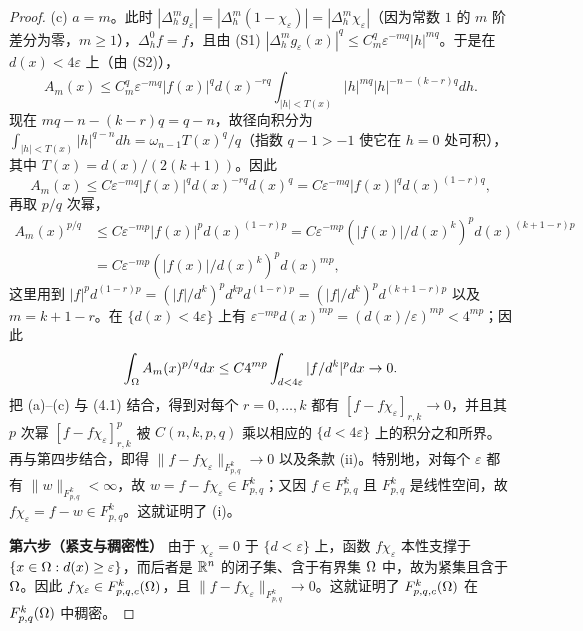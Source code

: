 \begin{proof}
(c) $a = m$。此时 $|\Delta_h^m g_\varepsilon| = |\Delta_h^m(1 - \chi_\varepsilon)| = |\Delta_h^m \chi_\varepsilon|$（因为常数 $1$ 的 $m$ 阶差分为零，$m \ge 1$），$\Delta_h^0 f = f$，且由 (S1) $|\Delta_h^m g_\varepsilon(x)|^q \le C_m^q \varepsilon^{-mq} |h|^{mq}$。于是在 $d(x) < 4 \varepsilon$ 上（由 (S2)），
\[
A_m(x) \le C_m^q \varepsilon^{-mq} |f(x)|^q d(x)^{-rq} \int_{|h|<T(x)} |h|^{mq} |h|^{-n-(k-r)q} dh.
\]
现在 $mq - n - (k-r)q = q - n$，故径向积分为 $\int_{|h|<T(x)} |h|^{q-n} dh = \omega_{n-1} T(x)^q / q$（指数 $q-1 > -1$ 使它在 $h = 0$ 处可积），其中 $T(x) = d(x)/(2(k+1))$。因此
\[
A_m(x) \le C \varepsilon^{-mq} |f(x)|^q d(x)^{-rq} d(x)^q = C \varepsilon^{-mq} |f(x)|^q d(x)^{(1-r)q},
\]
再取 $p/q$ 次幂，
\[
\begin{aligned}
A_m(x)^{p/q} &\le C \varepsilon^{-mp} |f(x)|^p d(x)^{(1-r)p} = C \varepsilon^{-mp} (|f(x)|/d(x)^k)^p d(x)^{(k+1-r)p} \\
&= C \varepsilon^{-mp} (|f(x)|/d(x)^k)^p d(x)^{mp},
\end{aligned}
\]
这里用到 $|f|^p d^{(1-r)p} = (|f|/d^k)^p d^{kp} d^{(1-r)p} = (|f|/d^k)^p d^{(k+1-r)p}$ 以及 $m = k+1-r$。在 $\{d(x) < 4 \varepsilon\}$ 上有 $\varepsilon^{-mp} d(x)^{mp} = (d(x)/\varepsilon)^{mp} < 4^{mp}$；因此
\[
\int_\Omega A_m(x)^{p/q} dx \le C 4^{mp} \int_{d<4\varepsilon} |f/d^k|^p dx \to 0.
\]
把 (a)--(c) 与 (4.1) 结合，得到对每个 $r = 0,\dots,k$ 都有 $[f - f \chi_\varepsilon]_{r,k} \to 0$，并且其 $p$ 次幂 $[f-f \chi_\varepsilon]_{r,k}^p$ 被 $C(n,k,p,q)$ 乘以相应的 $\{d<4\varepsilon\}$ 上的积分之和所界。再与第四步结合，即得 $\|f - f \chi_\varepsilon\|_{F^k_{p,q}} \to 0$ 以及条款 (ii)。特别地，对每个 $\varepsilon$ 都有 $\|w\|_{F^k_{p,q}} < \infty$，故 $w = f - f \chi_\varepsilon \in F^k_{p,q}$；又因 $f \in F^k_{p,q}$ 且 $F^k_{p,q}$ 是线性空间，故 $f \chi_\varepsilon = f - w \in F^k_{p,q}$。这就证明了 (i)。

\textbf{第六步（紧支与稠密性）} 由于 $\chi_\varepsilon = 0$ 于 $\{d < \varepsilon\}$ 上，函数 $f \chi_\varepsilon$ 本性支撑于 $\{x \in \Omega : d(x) \ge \varepsilon\}$，而后者是 $\mathbb{R}^n$ 的闭子集、含于有界集 $\Omega$ 中，故为紧集且含于 $\Omega$。因此 $f \chi_\varepsilon \in F^k_{p,q,c}(\Omega)$，且 $\|f - f \chi_\varepsilon\|_{F^k_{p,q}} \to 0$。这就证明了 $F^k_{p,q,c}(\Omega)$ 在 $F^k_{p,q}(\Omega)$ 中稠密。
\end{proof}

